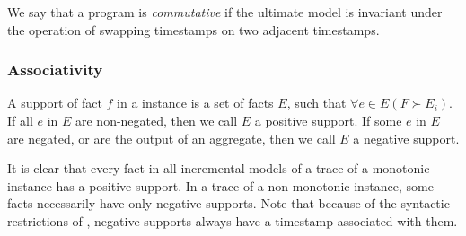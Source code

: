\begin{definition}
%
We say that a \lang program is {\em commutative} if the ultimate model is
invariant under the operation of swapping timestamps on two adjacent timestamps.
%
\end{definition}

\subsubsection{Associativity}

%
%

\begin{definition}
%
A support of fact $f$ in a \lang instance is a set of facts $E$, such
that $\forall e \in E (F \succ E_i)$.  If all $e$ in $E$ are non-negated, then
we call $E$ a positive support.  If some $e$ in $E$ are negated, or are the
output of an aggregate, then we call $E$ a negative support.  
%
\end{definition}

It is clear that every fact in all incremental models of a trace of a monotonic
\lang instance has a positive support.  In a trace of a non-monotonic \lang
instance, some facts necessarily have only negative supports.  Note that
because of the syntactic restrictions of \lang, negative supports always have a
timestamp associated with them.  

